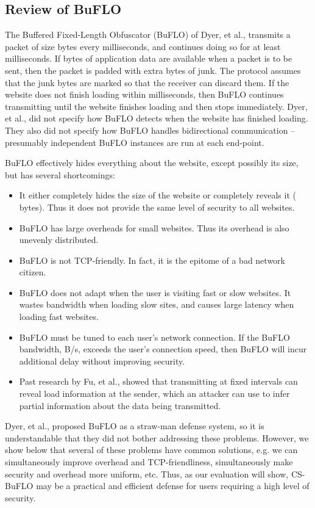 \documentclass[10pt,journal]{IEEEtran}
\newcommand{\buflo} {BuFLO\xspace}
\newcommand{\csb} {CS-BuFLO\xspace}
\begin{document}
\subsection{Review of \buflo}

The Buffered Fixed-Length Obfuscator (\buflo) of Dyer, et al.,
transmits a packet of size  bytes every  milliseconds, and
continues doing so for at least  milliseconds.  If  bytes
of application data are available when a packet is to be sent, then
the packet is padded with  extra bytes of junk.  The protocol
assumes that the junk bytes are marked so that the receiver can
discard them.  If the website does not finish loading within 
milliseconds, then \buflo continues transmitting until the website
finishes loading and then stops immediately.  Dyer, et al., did not
specify how \buflo detects when the website has finished loading.
They also did not specify how \buflo handles bidirectional
communication -- presumably independent \buflo instances are run at
each end-point.

\buflo effectively hides everything about the website, except possibly
its size, but has several shortcomings:
\begin{itemize}
  \item It either completely hides the size of the website or
    completely reveals it ( bytes).  Thus it does not provide
    the same level of security to all websites.
  \item \buflo has large overheads for small websites.  Thus its
    overhead is also unevenly distributed.
  \item \buflo is not TCP-friendly.  In fact, it is the epitome of a
    bad network citizen.
  \item \buflo does not adapt when the user is visiting fast or slow
    websites.  It wastes bandwidth when loading slow sites,
    and causes large latency when loading fast websites.
  \item \buflo must be tuned to each user's network connection.  If
    the \buflo bandwidth,  B/s, exceeds the user's
    connection speed, then \buflo will incur additional delay without
    improving security.
  \item Past research by Fu, et al., showed that transmitting at fixed
    intervals can reveal load information at the sender, which an
    attacker can use to infer partial information about the data being
    transmitted\cite{fu-iaw03}.
\end{itemize}
Dyer, et al., proposed \buflo as a straw-man defense system, so it is
understandable that they did not bother addressing these problems.
However, we show below that several of these problems have common
solutions, e.g. we can simultaneously improve overhead and
TCP-friendliness, simultaneously make security and overhead more
uniform, etc.  Thus, as our evaluation will show, \csb may be a
practical and efficient defense for users requiring a high level of
security.
\end{document}
